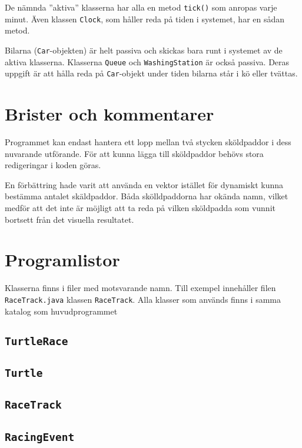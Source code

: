 \documentclass[a4paper]{article}
\newcommand{\code}[1]{\texttt{#1}} %
\begin{document}
De nämnda ''aktiva'' klasserna har alla en metod \code{tick()} som anropas varje minut. Även klassen \code{Clock}, som håller reda på tiden i systemet, har en sådan metod.

Bilarna (\code{Car}-objekten) är helt passiva och skickas bara runt i systemet av de aktiva klasserna. Klasserna \code{Queue} och \code{WashingStation} är också passiva. Deras uppgift är att hålla reda på \code{Car}-objekt under tiden bilarna står i kö eller tvättas. 


\section{Brister och kommentarer}
Programmet kan endast hantera ett lopp mellan två stycken sköldpaddor i dess nuvarande utförande. För att kunna lägga till sköldpaddor behövs stora redigeringar i koden göras.

En förbättring hade varit att använda en vektor istället för dynamiskt kunna bestämma antalet skäldpaddor.
Båda skölldpaddorna har okända namn, vilket medför att det inte är möjligt att ta reda på vilken sköldpadda som vunnit bortsett från det visuella resultatet.


\section{Programlistor}
Klasserna finns i filer med motsvarande namn. Till exempel innehåller filen  \code{RaceTrack.java} klassen \code{RaceTrack}. Alla klasser som används finns i samma katalog som huvudprogrammet

\subsection{\code{TurtleRace}}


\subsection{\code{Turtle}}

\subsection{\code{RaceTrack}}

\subsection{\code{RacingEvent}}



\end{document}
